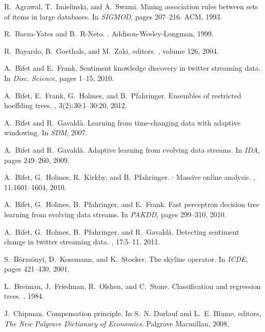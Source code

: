 \documentclass{sig-alternate}
\begin{document}
\begin{thebibliography}{10}

R.~Agrawal, T.~Imielinski, and A.~Swami.
\newblock Mining association rules between sets of items in large databases.
\newblock In {\em SIGMOD}, pages 207--216. ACM, 1993.

R.~Baeza-Yates and B.~R-Neto.
.
\newblock Addison-Wesley-Longman, 1999.

R.~Bayardo, B.~Goethals, and M.~Zaki, editors.
, volume
  126, 2004.

A.~Bifet and E.~Frank.
\newblock Sentiment knowledge discovery in twitter streaming data.
\newblock In {\em Disc. Science}, pages 1--15, 2010.

A.~Bifet, E.~Frank, G.~Holmes, and B.~Pfahringer.
\newblock Ensembles of restricted hoeffding trees.
, 3(2):30:1--30:20, 2012.

A.~Bifet and R.~Gavald{\`a}.
\newblock Learning from time-changing data with adaptive windowing.
\newblock In {\em SDM}, 2007.

A.~Bifet and R.~Gavald\`{a}.
\newblock Adaptive learning from evolving data streams.
\newblock In {\em IDA}, pages 249--260, 2009.

A.~Bifet, G.~Holmes, R.~Kirkby, and B.~Pfahringer.
: Massive online analysis.
, 11:1601--1604, 2010.

A.~Bifet, G.~Holmes, B.~Pfahringer, and E.~Frank.
\newblock Fast perceptron decision tree learning from evolving data streams.
\newblock In {\em PAKDD}, pages 299--310, 2010.

A.~Bifet, G.~Holmes, B.~Pfahringer, and R.~Gavald{\`a}.
\newblock Detecting sentiment change in twitter streaming data.
, 17:5--11, 2011.

S.~B{\"o}rzs{\"o}nyi, D.~Kossmann, and K.~Stocker.
\newblock The skyline operator.
\newblock In {\em ICDE}, pages 421--430, 2001.

L.~Breiman, J.~Friedman, R.~Olshen, and C.~Stone.
\newblock Classification and regression trees.
, 1984.

J.~Chipman.
\newblock Compensation principle.
\newblock In S.~N. Durlauf and L.~E. Blume, editors, {\em The New Palgrave
  Dictionary of Economics}. Palgrave Macmillan, 2008.


\end{thebibliography}
\end{document}
